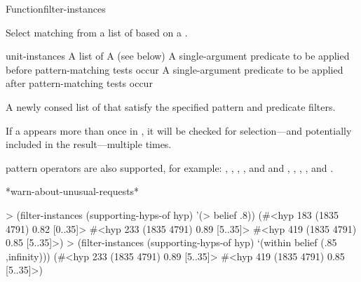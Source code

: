 \documentclass[10pt,twoside,english,pdftex]{article}
\begin{document}
\begin{functiondoc}{Function}{filter-instances}%
  {
     
    \returns{} }
%
%
%

\fnsyntax

\fnpurpose Select matching  from a list of
 based on a .

\fnpackage {}

\fnmodule {}

\fnargs
\begin{args}{unit-instances}
 A list of 
\arg[pattern] A  (see below)
 A single-argument predicate to be applied before
pattern-matching tests occur
 A single-argument predicate to be
applied after pattern-matching tests occur
\end{args}

%
%
\fnreturns A newly consed list of  that satisfy
the specified pattern and predicate filters.

\fndsyntax
\W\supp\tabletop
\patternspec{}

\fnterms
\W\supp\tabletop
\patternterms

\fndescription If a  appears more than once in
, it will be checked for selection---and potentially
included in the result---multiple times.

 pattern operators are also
supported, for example: \code{=\&}, \code{=\$\&}, \code{=\$}, \code{=\$\$},
and \code{=\$\$\$} and , , ,
, and .

\begin{alsos}{*warn-about-unusual-requests*}
\end{alsos}

\fnexamples
%
\W\supp
\begin{example}
> (filter-instances (supporting-hyps-of hyp) '(> belief .8))
(#<hyp 183 (1835 4791) 0.82 [0..35]>
 #<hyp 233 (1835 4791) 0.89 [5..35]>
 #<hyp 419 (1835 4791) 0.85 [5..35]>)\goodpagebreak
> (filter-instances (supporting-hyps-of hyp) `(within belief (.85 ,infinity)))
(#<hyp 233 (1835 4791) 0.89 [5..35]>
 #<hyp 419 (1835 4791) 0.85 [5..35]>)
\end{example}

\end{functiondoc}
\end{document}
